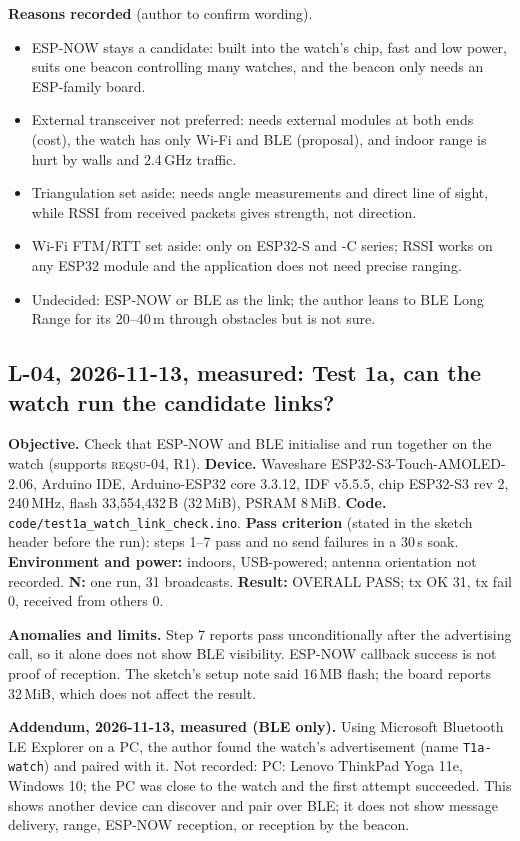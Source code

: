 \IfFileExists{IEEEtran.cls}{\documentclass[conference]{IEEEtran}}{\documentclass[10pt,twocolumn]{article}}
\newcommand{\req}[1]{\textsc{reqsu-}#1}
\begin{document}
\textbf{Reasons recorded} (author to confirm wording).
\begin{itemize}\setlength\itemsep{0pt}
\item ESP-NOW stays a candidate: built into the watch's chip, fast and low power, suits one beacon controlling many watches, and the beacon only needs an ESP-family board.
\item External transceiver not preferred: needs external modules at both ends (cost), the watch has only Wi-Fi and BLE (proposal), and indoor range is hurt by walls and 2.4\,GHz traffic.
\item Triangulation set aside: needs angle measurements and direct line of sight, while RSSI from received packets gives strength, not direction.
\item Wi-Fi FTM/RTT set aside: only on ESP32-S and -C series; RSSI works on any ESP32 module and the application does not need precise ranging.
\item Undecided: ESP-NOW or BLE as the link; the author leans to BLE Long Range for its 20--40\,m through obstacles but is not sure.
\end{itemize}

\subsection*{L-04, 2026-11-13, measured: Test 1a, can the watch run the candidate links?}
{\sloppy\textbf{Objective.} Check that ESP-NOW and BLE initialise and run together on the watch (supports \req{04}, R1). \textbf{Device.} Waveshare ESP32-S3-Touch-AMOLED-2.06, Arduino IDE, Arduino-ESP32 core 3.3.12, IDF v5.5.5, chip ESP32-S3 rev 2, 240\,MHz, flash 33{,}554{,}432\,B (32\,MiB), PSRAM 8\,MiB. \textbf{Code.} \texttt{code/test1a\_watch\_link\_check.ino}. \textbf{Pass criterion} (stated in the sketch header before the run): steps 1--7 pass and no send failures in a 30\,s soak. \textbf{Environment and power:} indoors, USB-powered; antenna orientation not recorded. \textbf{N:} one run, 31 broadcasts. \textbf{Result:} OVERALL PASS; tx OK 31, tx fail 0, received from others 0.}

\textbf{Anomalies and limits.} Step 7 reports pass unconditionally after the advertising call, so it alone does not show BLE visibility. ESP-NOW callback success is not proof of reception. The sketch's setup note said 16\,MB flash; the board reports 32\,MiB, which does not affect the result.

\textbf{Addendum, 2026-11-13, measured (BLE only).} Using Microsoft Bluetooth LE Explorer on a PC, the author found the watch's advertisement (name \texttt{T1a-watch}) and paired with it. Not recorded: PC: Lenovo ThinkPad Yoga 11e, Windows 10; the PC was close to the watch and the first attempt succeeded. This shows another device can discover and pair over BLE; it does not show message delivery, range, ESP-NOW reception, or reception by the beacon.
\end{document}
